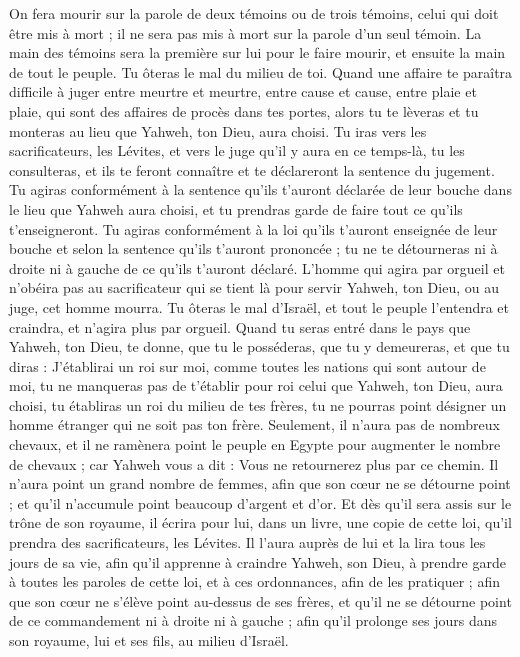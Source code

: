 \begin{multicols}{2}
On fera mourir sur la parole de deux témoins ou de trois témoins\FTNT{}, celui qui doit être mis à mort ; il ne sera pas mis à mort sur la parole d'un seul témoin.
La main des témoins sera la première sur lui pour le faire mourir, et ensuite la main de tout le peuple. Tu ôteras le mal du milieu de toi.
Quand une affaire te paraîtra difficile à juger entre meurtre et meurtre, entre cause et cause, entre plaie et plaie, qui sont des affaires de procès dans tes portes, alors tu te lèveras et tu monteras au lieu que Yahweh, ton Dieu, aura choisi.
Tu iras vers les sacrificateurs, les Lévites, et vers le juge qu’il y aura en ce temps-là, tu les consulteras, et ils te feront connaître et te déclareront la sentence du jugement.
Tu agiras conformément à la sentence qu’ils t’auront déclarée de leur bouche dans le lieu que Yahweh aura choisi, et tu prendras garde de faire tout ce qu'ils t'enseigneront.
Tu agiras conformément à la loi qu'ils t'auront enseignée de leur bouche et selon la sentence qu'ils t'auront prononcée ; tu ne te détourneras ni à droite ni à gauche de ce qu'ils t'auront déclaré.
L'homme qui agira par orgueil et n’obéira pas au sacrificateur qui se tient là pour servir Yahweh, ton Dieu, ou au juge, cet homme mourra. Tu ôteras le mal d'Israël,
et tout le peuple l'entendra et craindra, et n’agira plus par orgueil.
Quand tu seras entré dans le pays que Yahweh, ton Dieu, te donne, que tu le posséderas, que tu y demeureras, et que tu diras : J'établirai un roi sur moi, comme toutes les nations qui sont autour de moi,
tu ne manqueras pas de t'établir pour roi celui que Yahweh, ton Dieu, aura choisi, tu établiras un roi du milieu de tes frères, tu ne pourras point désigner un homme étranger qui ne soit pas ton frère.
Seulement, il n’aura pas de nombreux chevaux, et il ne ramènera point le peuple en Egypte pour augmenter le nombre de chevaux ; car Yahweh vous a dit : Vous ne retournerez plus par ce chemin.
Il n’aura point un grand nombre de femmes, afin que son cœur ne se détourne point ; et qu’il n’accumule point beaucoup d'argent et d’or.
Et dès qu'il sera assis sur le trône de son royaume, il écrira pour lui, dans un livre, une copie de cette loi, qu’il prendra des sacrificateurs, les Lévites.
Il l’aura auprès de lui et la lira tous les jours de sa vie, afin qu'il apprenne à craindre Yahweh, son Dieu, à prendre garde à toutes les paroles de cette loi, et à ces ordonnances, afin de les pratiquer ;
afin que son cœur ne s'élève point au-dessus de ses frères, et qu'il ne se détourne point de ce commandement ni à droite ni à gauche ; afin qu'il prolonge ses jours dans son royaume, lui et ses fils, au milieu d'Israël.

\end{multicols}
